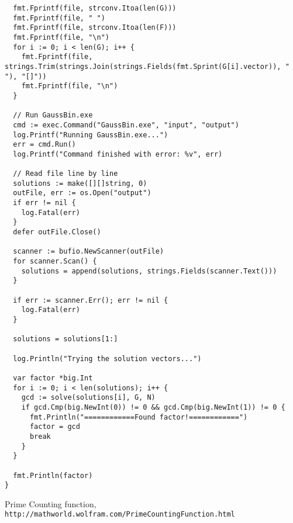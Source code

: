 \documentclass{article}
\theoremstyle{definition}
\theoremstyle{definition}
\theoremstyle{definition}
\begin{document}
\begin{verbatim}
  fmt.Fprintf(file, strconv.Itoa(len(G)))
  fmt.Fprintf(file, " ")
  fmt.Fprintf(file, strconv.Itoa(len(F)))
  fmt.Fprintf(file, "\n")
  for i := 0; i < len(G); i++ {
    fmt.Fprintf(file, strings.Trim(strings.Join(strings.Fields(fmt.Sprint(G[i].vector)), " "), "[]"))
    fmt.Fprintf(file, "\n")
  }

  // Run GaussBin.exe
  cmd := exec.Command("GaussBin.exe", "input", "output")
  log.Printf("Running GaussBin.exe...")
  err = cmd.Run()
  log.Printf("Command finished with error: %v", err)

  // Read file line by line
  solutions := make([][]string, 0)
  outFile, err := os.Open("output")
  if err != nil {
    log.Fatal(err)
  }
  defer outFile.Close()

  scanner := bufio.NewScanner(outFile)
  for scanner.Scan() {
    solutions = append(solutions, strings.Fields(scanner.Text()))
  }

  if err := scanner.Err(); err != nil {
    log.Fatal(err)
  }

  solutions = solutions[1:]

  log.Println("Trying the solution vectors...")

  var factor *big.Int
  for i := 0; i < len(solutions); i++ {
    gcd := solve(solutions[i], G, N)
    if gcd.Cmp(big.NewInt(0)) != 0 && gcd.Cmp(big.NewInt(1)) != 0 {
      fmt.Println("============Found factor!============")
      factor = gcd
      break
    }
  }

  fmt.Println(factor)
}
\end{verbatim}

\begin{thebibliography}{9}
Prime Counting function, \\
\texttt{http://mathworld.wolfram.com/PrimeCountingFunction.html}
\end{thebibliography}
\end{document}
